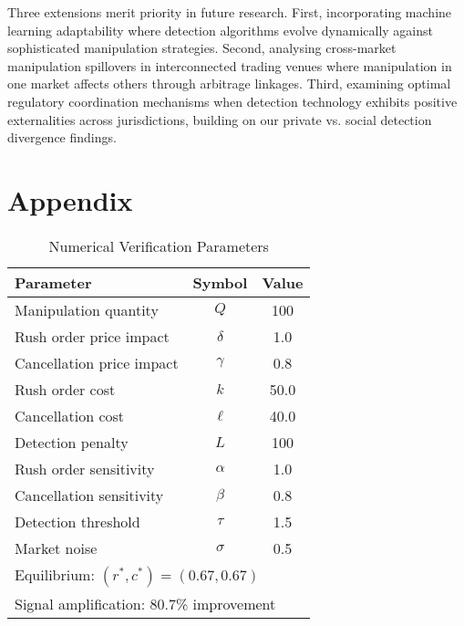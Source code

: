 \documentclass[12pt]{article}
\begin{document}
Three extensions merit priority in future research. First, incorporating machine learning adaptability where detection algorithms evolve dynamically against sophisticated manipulation strategies. Second, analysing cross-market manipulation spillovers in interconnected trading venues where manipulation in one market affects others through arbitrage linkages. Third, examining optimal regulatory coordination mechanisms when detection technology exhibits positive externalities across jurisdictions, building on our private vs. social detection divergence findings.




\appendix
\section*{Appendix}

\begin{table}[htbp]
\centering
\caption{Numerical Verification Parameters}
\label{tab:num-verif-params}
\begin{tabular}{lcc}
\hline
Parameter & Symbol & Value \\
\hline
Manipulation quantity & $Q$ & 100 \\
Rush order price impact & $\delta$ & 1.0 \\
Cancellation price impact & $\gamma$ & 0.8 \\
Rush order cost & $k$ & 50.0 \\
Cancellation cost & $\ell$ & 40.0 \\
Detection penalty & $L$ & 100 \\
Rush order sensitivity & $\alpha$ & 1.0 \\
Cancellation sensitivity & $\beta$ & 0.8 \\
Detection threshold & $\tau$ & 1.5 \\
Market noise & $\sigma$ & 0.5 \\
\hline
\multicolumn{3}{l}{\footnotesize Equilibrium: $(r^*, c^*) = (0.67, 0.67)$} \\
\multicolumn{3}{l}{\footnotesize Signal amplification: 80.7\% improvement} \\
\hline
\end{tabular}
\end{table}
\end{document}
